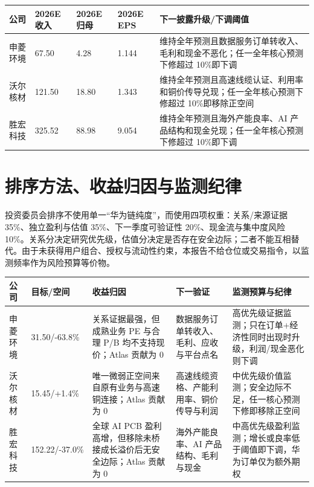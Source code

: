 \begin{exhibitbox}[前三类优先标的的量化盈利门槛]
\begin{tabularx}{\textwidth}{L{2.1cm}R{1.8cm}R{1.7cm}R{1.5cm}X}
\toprule
\textbf{公司} & \textbf{2026E 收入} & \textbf{2026E 归母} & \textbf{2026E EPS} & \textbf{下一披露升级/下调阈值}\\
\midrule
申菱环境 & 67.50 & 4.28 & 1.144 & 维持全年预测且数据服务订单转收入、毛利和现金不恶化；任一全年核心预测下修超过 10\%即下调\\
沃尔核材 & 121.50 & 18.80 & 1.343 & 维持全年预测且高速线缆认证、利用率和铜价传导兑现；任一全年核心预测下修超过 10\%即移除正空间\\
胜宏科技 & 325.52 & 88.98 & 9.054 & 维持全年预测且海外产能良率、AI 产品结构和现金兑现；任一全年核心预测下修超过 10\%即下调\\
\bottomrule
\end{tabularx}
\end{exhibitbox}

\section{排序方法、收益归因与监测纪律}

投资委员会排序不使用单一“华为链纯度”，而使用四项权重：关系/来源证据 35\%、独立盈利与估值 35\%、下一季度可验证性 20\%、现金流与集中度风险 10\%。关系分决定研究优先级，估值分决定是否存在安全边际；二者不能互相替代。由于未获得用户组合、授权与流动性约束，本报告不给仓位或交易指令，以监测频率作为风险预算等价物。

\begin{exhibitbox}[前三类研究优先级与预期收益归因]
\begin{tabularx}{\textwidth}{L{2.2cm}L{2.2cm}L{3.0cm}L{3.3cm}X}
\toprule
\textbf{公司} & \textbf{目标/空间} & \textbf{收益归因} & \textbf{下一验证} & \textbf{监测预算与纪律}\\
\midrule
申菱环境 & 31.50/-63.8\% & 关系证据最强，但成熟业务 PE 与合理 P/B 均不支持现价；Atlas 贡献为 0 & 数据服务订单转收入、毛利、应收与平台点名 & 高优先级证据监测；只在订单+经济性同时出现时升级，利润/现金恶化则下调\\
沃尔核材 & 15.45/+1.4\% & 唯一微弱正空间来自原有业务与高速铜连接；Atlas 贡献为 0 & 高速线缆资格、产能利用率、铜价传导与利润 & 中优先级价值监测；安全边际不足，任一核心预测下修即移除正空间\\
胜宏科技 & 152.22/-37.0\% & 全球 AI PCB 盈利高增，但移除未桥接成长溢价后无安全边际；Atlas 贡献为 0 & 海外产能良率、AI 产品结构、毛利与现金 & 中高优先级盈利监测；增长或良率低于阈值即下调，华为订单仅为额外期权\\
\bottomrule
\end{tabularx}
\end{exhibitbox}

